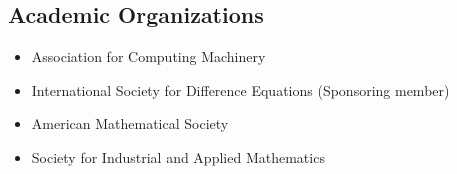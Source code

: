 \documentclass[overlapped,line,letterpaper]{res}
\begin{document}
\begin{resume}




\section{\bf Academic Organizations}

\begin{itemize}
\item Association for Computing Machinery
\item International Society for Difference Equations (Sponsoring member)
\item American Mathematical Society
\item Society for Industrial and Applied Mathematics
\end{itemize}





\end{resume}
\end{document}
